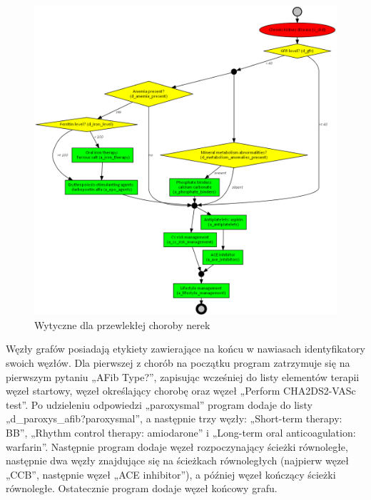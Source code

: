 \begin{figure}[H]
\centering
\includegraphics[scale=0.4]{img/ckd-simplified-ver-5_przyklad.png}
\caption{Wytyczne dla przewlekłej choroby nerek}
\label{fig:ckd_przyklad}
\end{figure}
Węzły grafów posiadają etykiety zawierające na końcu w nawiasach identyfikatory swoich węzłów. Dla pierwszej z chorób na początku program zatrzymuje się na pierwszym pytaniu „AFib Type?”, zapisując wcześniej do listy elementów terapii węzeł startowy, węzeł określający chorobę oraz węzeł „Perform CHA2DS2-VASc test”. Po udzieleniu odpowiedzi „paroxysmal” program dodaje do listy „d\_paroxys\_afib?paroxysmal”, a następnie trzy węzły: „Short-term therapy: BB”, „Rhythm control therapy: amiodarone” i „Long-term oral anticoagulation: warfarin”. Następnie program dodaje węzeł rozpoczynający ścieżki równoległe, następnie dwa węzły znajdujące się na ścieżkach równoległych (najpierw węzeł „CCB”, następnie węzeł „ACE inhibitor”), a później węzeł kończący ścieżki równoległe. Ostatecznie program dodaje węzeł końcowy grafu. 

